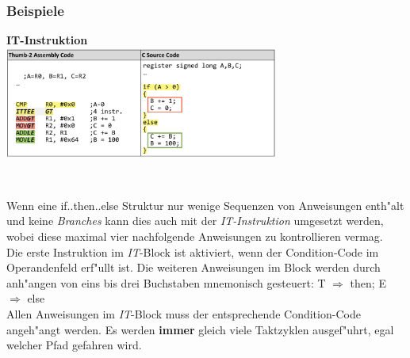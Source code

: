 \subsubsection{Beispiele}
\begin{minipage}[t]{9cm}
	\textbf{IT-Instruktion}\\
	
	\includegraphics[width = 9cm]{images/IT-Instruction}
\end{minipage}
%
\begin{minipage}[t]{0.5cm}
	\-\
\end{minipage}
%
\begin{minipage}[t]{9cm}
	Wenn eine if..then..else Struktur nur wenige Sequenzen von Anweisungen enth"alt und keine \textit{Branches} kann dies auch mit der \textit{IT-Instruktion} umgesetzt werden, wobei diese maximal vier nachfolgende Anweisungen zu kontrollieren vermag.\\
	Die erste Instruktion im \textit{IT}-Block ist aktiviert, wenn der Condition-Code im Operandenfeld  erf"ullt ist. Die weiteren Anweisungen im Block werden durch anh"angen von eins bis drei Buchstaben mnemonisch gesteuert: T $\Rightarrow$ then; E $\Rightarrow$ else \\
		Allen Anweisungen im \textit{IT}-Block muss der entsprechende Condition-Code angeh"angt werden. Es werden \textbf{immer} gleich viele Taktzyklen ausgef"uhrt, egal welcher Pfad gefahren wird.
\end{minipage}
\newpage

